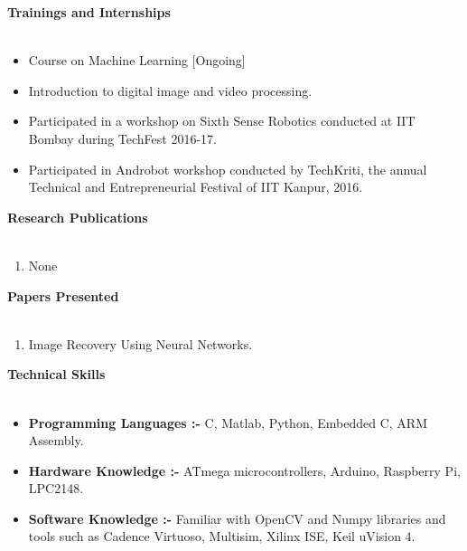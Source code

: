 \documentclass[15pt]{article}
\begin{document}
\begin{flushleft}
	{\textbf{Trainings and Internships}} \\
	\vspace{0.5mm}
	\noindent \hrulefill 
	\vspace{0.5mm} \\
	\begin{itemize}
		\item Course on Machine Learning [Ongoing]
		\item Introduction to digital image and video processing.
		\item Participated in a workshop on Sixth Sense Robotics conducted at IIT Bombay during TechFest 2016-17.
		\item Participated in Androbot workshop conducted by TechKriti, the annual Technical and Entrepreneurial Festival of IIT Kanpur, 2016.
	\end{itemize}
\end{flushleft}
\vspace{1mm}
\begin{flushleft}
	{\textbf{Research Publications}} \\
	\vspace{0.5mm}
	\noindent \hrulefill 
	\vspace{0.5mm} \\
	\begin{enumerate}
		\item None
	\end{enumerate}
\end{flushleft}
\vspace{1mm}
\begin{flushleft}
	{\textbf{Papers Presented}} \\
	\vspace{0.5mm}
	\noindent \hrulefill 
	\vspace{0.5mm} \\
	\begin{enumerate}
		\item Image Recovery Using Neural Networks.
	\end{enumerate}
\end{flushleft}
\vspace{1mm}
\begin{flushleft}
	{\textbf{Technical Skills}} \\
	\vspace{0.5mm}
	\noindent \hrulefill 
	\vspace{0.5mm} \\
	\begin{itemize}
		\item \textbf{Programming Languages :-} C, Matlab, Python, Embedded C, ARM Assembly.
		\item \textbf{Hardware Knowledge :-} ATmega microcontrollers, Arduino, Raspberry Pi, LPC2148.
		\item \textbf{Software Knowledge :-}
		Familiar with OpenCV and Numpy libraries and tools such as Cadence Virtuoso, Multisim, Xilinx ISE, Keil uVision 4.
	\end{itemize}
\end{flushleft}
\end{document}
